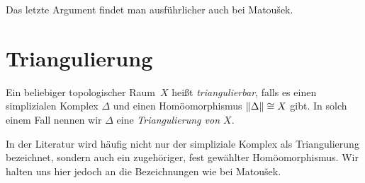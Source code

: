 Das letzte Argument findet man ausführlicher auch bei 
Matou\v sek\cite[Lemma~1.3.6]{bookc:matousek03}.


\section{Triangulierung}
\begin{thDef}
    Ein beliebiger topologischer Raum~$X$ heißt \emph{triangulierbar}, falls es
    einen simplizialen Komplex $\Delta$ und einen Homöomorphismus
    $\lVert\Delta\rVert \cong X$ gibt. In solch einem Fall nennen wir $\Delta$ eine
    \emph{Triangulierung von $X$}.
\end{thDef}

\Achtung
In der Literatur wird häufig nicht nur der simpliziale Komplex als
Triangulierung bezeichnet, sondern auch ein zugehöriger, fest gewählter
Homöomorphismus. Wir halten uns hier jedoch an die Bezeichnungen wie bei
Matou\v sek\cite{bookc:matousek03}.



